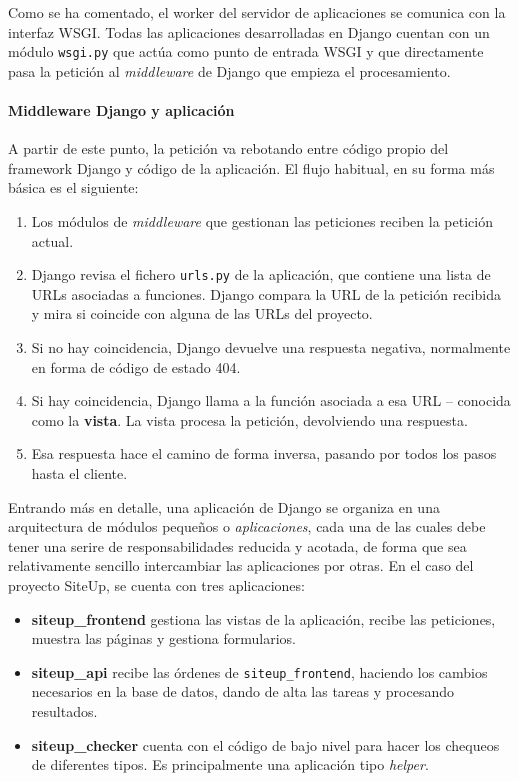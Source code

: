 Como se ha comentado, el worker del servidor de aplicaciones se comunica con la
interfaz WSGI. Todas las aplicaciones desarrolladas en Django cuentan con un
módulo \texttt{wsgi.py} que actúa como punto de entrada WSGI y que directamente
pasa la petición al \textit{middleware} de Django que empieza el procesamiento.

\paragraph{Middleware Django y aplicación}

A partir de este punto, la petición va rebotando entre código propio del
framework Django y código de la aplicación. El flujo habitual, en su forma más
básica es el siguiente:

\begin{enumerate}
\item Los módulos de \textit{middleware} que gestionan las peticiones reciben la
  petición actual.
\item Django revisa el fichero \texttt{urls.py} de la aplicación, que contiene
  una lista de URLs asociadas a funciones. Django compara la URL de la petición
  recibida y mira si coincide con alguna de las URLs del proyecto.
\item Si no hay coincidencia, Django devuelve una respuesta negativa,
  normalmente en forma de código de estado 404.
\item Si hay coincidencia, Django llama a la función asociada a esa URL --
  conocida como la \textbf{vista}. La vista procesa la petición, devolviendo una
  respuesta.
\item Esa respuesta hace el camino de forma inversa, pasando por todos los pasos
  hasta el cliente.
\end{enumerate}

Entrando más en detalle, una aplicación de Django se organiza en una
arquitectura de módulos pequeños o \textit{aplicaciones}, cada una de las cuales
debe tener una serire de responsabilidades reducida y acotada, de forma que sea
relativamente sencillo intercambiar las aplicaciones por otras. En el caso del
proyecto SiteUp, se cuenta con tres aplicaciones:

\begin{itemize}
\item \textbf{siteup\_frontend} gestiona las vistas de la aplicación, recibe las
  peticiones, muestra las páginas y gestiona formularios.

\item \textbf{siteup\_api} recibe las órdenes de \texttt{siteup\_frontend},
  haciendo los cambios necesarios en la base de datos, dando de alta las tareas
  y procesando resultados.

\item \textbf{siteup\_checker} cuenta con el código de bajo nivel para hacer los
  chequeos de diferentes tipos. Es principalmente una aplicación tipo
  \textit{helper}.

\end{itemize}

